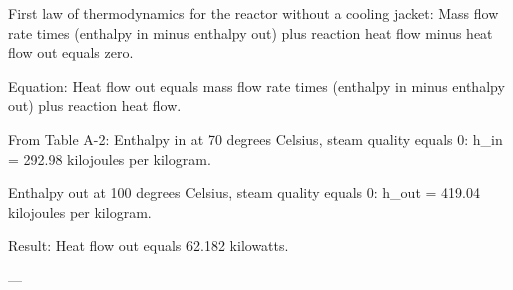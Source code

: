 First law of thermodynamics for the reactor without a cooling jacket:  
Mass flow rate times (enthalpy in minus enthalpy out) plus reaction heat flow minus heat flow out equals zero.  

Equation:  
Heat flow out equals mass flow rate times (enthalpy in minus enthalpy out) plus reaction heat flow.  

From Table A-2:  
Enthalpy in at 70 degrees Celsius, steam quality equals 0:  
h_in = 292.98 kilojoules per kilogram.  

Enthalpy out at 100 degrees Celsius, steam quality equals 0:  
h_out = 419.04 kilojoules per kilogram.  

Result:  
Heat flow out equals 62.182 kilowatts.  

---